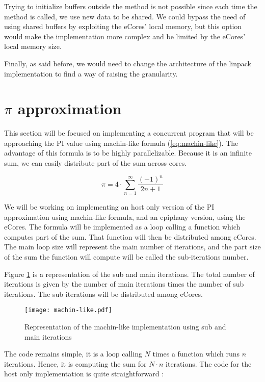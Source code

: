 Trying to initialize buffers outside the  method is not possible since each time the method is called, we use new data to be shared. We could bypass the need of using shared buffers by exploiting the \glspl{eCore}' local memory, but this option would make the implementation more complex and be limited by the \glspl{eCore}' local memory size.

Finally, as said before, we would need to change the architecture of the linpack implementation to find a way of raising the granularity.

\section{$\pi$ approximation}

This section will be focused on implementing a concurrent program that will be approaching the PI value using machin-like formula (\ref{eq:machin-like}). The advantage of this formula is to be highly parallelizable. Because it is an infinite sum, we can easily distribute part of the sum across cores. 

\begin{equation}
	\pi = 4 \cdot \sum_{n=1}^{\infty} \frac{(-1)^n}{2n + 1}
	\label{eq:machin-like}
\end{equation}

We will be working on implementing an host only version of the PI approximation using machin-like formula, and an \gls{epiphany} version, using the \glspl{eCore}. The formula will be implemented as a loop calling a function which computes part of the sum. That function will then be distributed among \glspl{eCore}. The main loop size will represent the main number of iterations, and the part size of the sum the function will compute will be called the sub-iterations number.

Figure \ref{fig machin-like} is a representation of the sub and main iterations. The total number of iterations is given by the number of main iterations times the number of sub iterations. The sub iterations will be distributed among \glspl{eCore}.

\begin{figure}[h!]
\centering
\texttt{[image: machin-like.pdf]}
\caption{Representation of the machin-like implementation using sub and main iterations}
\label{fig machin-like}
\end{figure}

The code remains simple, it is a loop calling $N$ times a function which runs $n$ iterations. Hence, it is computing the sum for $N \cdot n$ iterations. The code for the host only implementation is quite straightforward :

